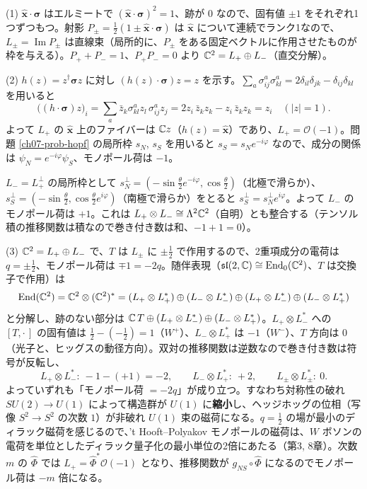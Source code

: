 \begin{solution}
(1) $\hat{\bm x}\cdot\bm\sigma$ はエルミートで $(\hat{\bm x}\cdot\bm\sigma)^2=1$、跡が $0$ なので、固有値 $\pm1$ をそれぞれ1つずつもつ。射影 $P_\pm=\frac12(1\pm\hat{\bm x}\cdot\bm\sigma)$ は $\hat{\bm x}$ について連続でランク1なので、$L_\pm=\operatorname{Im}P_\pm$ は直線束（局所的に、$P_\pm$ をある固定ベクトルに作用させたものが枠を与える）。$P_++P_-=1$、$P_+P_-=0$ より $\mathbb{C}^2=L_+\oplus L_-$（直交分解）。

(2) $h(z)=z^\dagger\bm\sigma z$ に対し $(h(z)\cdot\bm\sigma)z=z$ を示す。$\sum_a\sigma^a_{ij}\sigma^a_{kl}=2\delta_{il}\delta_{jk}-\delta_{ij}\delta_{kl}$ を用いると
\[
\bigl((h\cdot\bm\sigma)z\bigr)_i=\sum_a\bar z_k\sigma^a_{kl}z_l\,\sigma^a_{ij}z_j=2z_i\,\bar z_kz_k-z_i\,\bar z_kz_k=z_i\quad(\lvert z\rvert=1).
\]
よって $L_+$ の $\hat{\bm x}$ 上のファイバーは $\mathbb{C} z$（$h(z)=\hat{\bm x}$）であり、$L_+=\mathcal O(-1)$。問題 \ref{ch07-prob-hopf} の局所枠 $s_N$, $s_S$ を用いると $s_S=s_Ne^{-i\varphi}$ なので、成分の関係は $\psi_N=e^{-i\varphi}\psi_S$、モノポール荷は $-1$。

$L_-=L_+^\perp$ の局所枠として $s_N^\perp=(-\sin\frac\theta2e^{-i\varphi},\cos\frac\theta2)$（北極で滑らか）、$s_S^\perp=(-\sin\frac\theta2,\cos\frac\theta2e^{i\varphi})$（南極で滑らか）をとると $s_S^\perp=s_N^\perp e^{i\varphi}$。よって $L_-$ のモノポール荷は $+1$。これは $L_+\otimes L_-\cong\Lambda^2\mathbb{C}^2$（自明）とも整合する（テンソル積の推移関数は積なので巻き付き数は和、$-1+1=0$）。

(3) $\mathbb{C}^2=L_+\oplus L_-$ で、$T$ は $L_\pm$ に $\pm\frac12$ で作用するので、2重項成分の電荷は $q=\pm\frac12$、モノポール荷は $\mp1=-2q$。随伴表現（$\mathfrak{sl}(2,\mathbb{C})\cong\operatorname{End}_0(\mathbb{C}^2)$、$T$ は交換子で作用）は
\[
\operatorname{End}(\mathbb{C}^2)=\mathbb{C}^2\otimes(\mathbb{C}^2)^*=(L_+\otimes L_+^*)\oplus(L_-\otimes L_-^*)\oplus(L_+\otimes L_-^*)\oplus(L_-\otimes L_+^*)
\]
と分解し、跡のない部分は $\mathbb{C}\,T\oplus(L_+\otimes L_-^*)\oplus(L_-\otimes L_+^*)$。$L_+\otimes L_-^*$ への $[T,\cdot\,]$ の固有値は $\frac12-(-\frac12)=1$（$W^+$）、$L_-\otimes L_+^*$ は $-1$（$W^-$）、$T$ 方向は $0$（光子と、ヒッグスの動径方向）。双対の推移関数は逆数なので巻き付き数は符号が反転し、
\[
L_+\otimes L_-^*:\ -1-(+1)=-2,\qquad L_-\otimes L_+^*:\ +2,\qquad L_\pm\otimes L_\pm^*:\ 0 .
\]
よっていずれも「モノポール荷 $=-2q$」が成り立つ。すなわち対称性の破れ $SU(2)\to U(1)$ によって構造群が $U(1)$ に\textbf{縮小}し、ヘッジホッグの位相（写像 $S^2\to S^2$ の次数 $1$）が非破れ $U(1)$ 束の磁荷になる。$q=\frac12$ の場が最小のディラック磁荷を感じるので、't Hooft--Polyakov モノポールの磁荷は、$W$ ボソンの電荷を単位としたディラック量子化の最小単位の2倍にあたる（第3, 8章）。次数 $m$ の $\hat\Phi$ では $L_+=\hat\Phi^*\mathcal O(-1)$ となり、推移関数が $g_{NS}\circ\hat\Phi$ になるのでモノポール荷は $-m$ 倍になる。
\end{solution}

